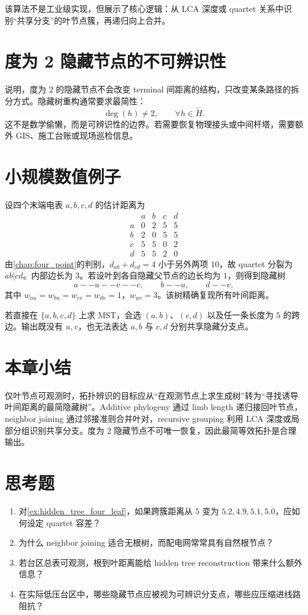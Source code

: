 该算法不是工业级实现，但展示了核心逻辑：从 LCA 深度或 quartet 关系中识别“共享分支”的叶节点簇，再递归向上合并。

\section{度为 2 隐藏节点的不可辨识性}

说明，度为 $2$ 的隐藏节点不会改变 terminal 间距离的结构，只改变某条路径的拆分方式。隐藏树重构通常要求最简性：
\begin{equation}
  \deg(h)\ne 2,\qquad \forall h\in \widetilde H.
\end{equation}
这不是数学偷懒，而是可辨识性的边界。若需要恢复物理接头或中间杆塔，需要额外 GIS、施工台账或现场巡检信息。

\section{小规模数值例子}

\begin{example}[从四个叶节点恢复两个隐藏分支点]
\label{ex:hidden_tree_four_leaf}
设四个末端电表 $a,b,c,d$ 的估计距离为
\[
\begin{array}{c|cccc}
 & a&b&c&d\\ \hline
a&0&2&5&5\\
b&2&0&5&5\\
c&5&5&0&2\\
d&5&5&2&0
\end{array}
\]
由\cref{chap:four_point}的判别，$d_{ab}+d_{cd}=4$ 小于另外两项 $10$，故 quartet 分裂为 $ab|cd$。内部边长为 $3$。若设叶到各自隐藏父节点的边长均为 $1$，则得到隐藏树
\[
  a--u--v--c,\qquad b--u,\qquad d--v,
\]
其中 $w_{au}=w_{bu}=w_{cv}=w_{dv}=1$，$w_{uv}=3$。该树精确复现所有叶间距离。

若直接在 $\{a,b,c,d\}$ 上求 MST，会选 $(a,b)$、$(c,d)$ 以及任一条长度为 $5$ 的跨边。输出既没有 $u,v$，也无法表达 $a,b$ 与 $c,d$ 分别共享隐藏分支点。
\end{example}

\section{本章小结}

仅叶节点可观测时，拓扑辨识的目标应从“在观测节点上求生成树”转为“寻找诱导叶间距离的最简隐藏树”。Additive phylogeny 通过 limb length 递归接回叶节点，neighbor joining 通过邻接准则合并叶对，recursive grouping 利用 LCA 深度或局部分组识别共享分支。度为 $2$ 隐藏节点不可唯一恢复，因此最简等效拓扑是合理输出。

\section*{思考题}
\begin{enumerate}
  \item 对\cref{ex:hidden_tree_four_leaf}，如果跨簇距离从 $5$ 变为 $5.2,4.9,5.1,5.0$，应如何设定 quartet 容差？
  \item 为什么 neighbor joining 适合无根树，而配电网常常具有自然根节点？
  \item 若台区总表可观测，根到叶距离能给 hidden tree reconstruction 带来什么额外信息？
  \item 在实际低压台区中，哪些隐藏节点应被视为可辨识分支点，哪些应压缩进线路阻抗？
\end{enumerate}
